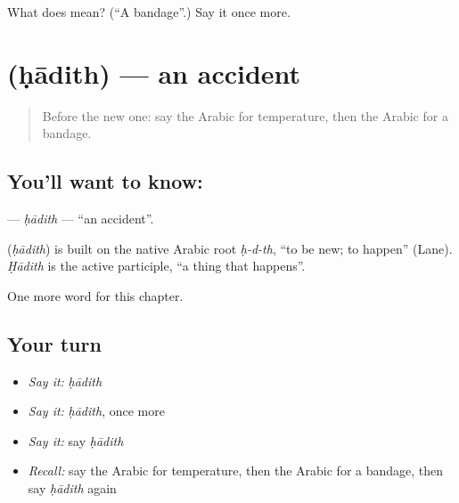 \begin{tcolorbox}[breakable,colback=teal!4,colframe=teal!35!black,title={Before you move on}]
What does  mean? (\textquotedblleft{}A bandage\textquotedblright{}.) Say it once more.
\end{tcolorbox}
\section[\texorpdfstring{\ar{حادث} (ḥādith)}{حادث (ḥādith)}]{ (ḥādith) — an accident}

\label{lesson:AR-C262-hadith2}



\begin{quote}
Before the new one: say the Arabic for temperature, then the Arabic for a bandage.
\end{quote}

\subsection*{You'll want to know: }
\textbf{} — \emph{ḥādith} — \textquotedblleft{}an accident\textquotedblright{}.

\begin{cousinweb}
\textbf{} (\emph{ḥādith}) is built on the native Arabic root \emph{ḥ-d-th}, \textquotedblleft{}to be new; to happen\textquotedblright{} (Lane). \emph{Ḥādith} is the active participle, \textquotedblleft{}a thing that happens\textquotedblright{}.
\end{cousinweb}

\begin{grammarlens}[title={What you've built}]
One more word for this chapter.
\end{grammarlens}

\subsection*{Your turn}
\begin{itemize}
\raggedright
  \item \emph{Say it:} \emph{ḥādith}
  \item \emph{Say it:} \emph{ḥādith}, once more
  \item \emph{Say it:} say \emph{ḥādith}
  \item \emph{Recall:} say the Arabic for temperature, then the Arabic for a bandage, then say \emph{ḥādith} again
\end{itemize}


